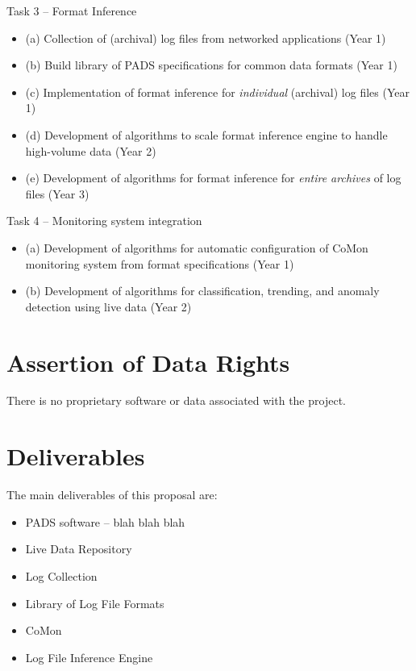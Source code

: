 \documentclass[12pt]{article}
\begin{document}
\noindent
Task 3 -- Format Inference
\begin{itemize}
\item (a) Collection of (archival) log files from networked applications (Year 1)
\item (b) Build library of PADS specifications for common data formats (Year 1)
\item (c) Implementation of format inference for {\em individual} (archival) log files (Year 1)
\item (d) Development of algorithms to scale format inference engine to handle high-volume data (Year 2)
\item (e) Development of algorithms for format inference for {\em entire archives} of log files (Year 3)
\end{itemize}

\noindent
Task 4 -- Monitoring system integration
\begin{itemize}
\item (a) Development of algorithms for automatic configuration of CoMon monitoring system from format specifications (Year 1)
\item (b) Development of algorithms for classification, trending, and 
anomaly detection using live data (Year 2)
\end{itemize}




\section{Assertion of Data Rights}

There is no proprietary software or data associated with the project.

\newpage
\section{Deliverables}

The main deliverables of this proposal are:

\begin{itemize}
\item PADS software -- blah blah blah

\item Live Data Repository

\item Log Collection

\item Library of Log File Formats

\item CoMon

\item Log File Inference Engine

\end{itemize}
\end{document}
